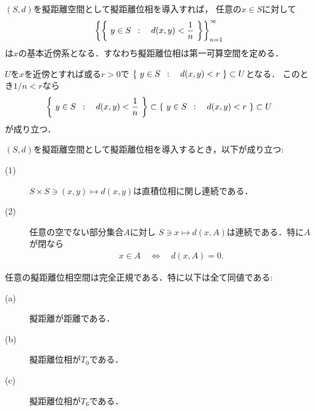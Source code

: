 	\begin{screen}
		\begin{thm}[擬距離位相は第一可算]
			$(S,d)$を擬距離空間として擬距離位相を導入すれば，
			任意の$x \in S$に対して
			\begin{align}
				\left\{\left\{\ y \in S\ \, : \quad d(x,y) < \frac{1}{n}\ \right\}\right\}_{n=1}^\infty
			\end{align}
			は$x$の基本近傍系となる．すなわち擬距離位相は第一可算空間を定める．
		\end{thm}
	\end{screen}
	
	\begin{prf}
		$U$を$x$を近傍とすれば或る$r > 0$で
		$\left\{\ y \in S\ \, : \quad d(x,y) < r\ \right\} \subset U$となる．
		このとき$1/n < r$なら
		\begin{align}
			\left\{\ y \in S\ \, : \quad d(x,y) < \frac{1}{n}\ \right\}
			\subset \left\{\ y \in S\ \, : \quad d(x,y) < r\ \right\} \subset U
		\end{align}
		が成り立つ．
		\QED
	\end{prf}
	
	\begin{screen}
		\begin{thm}[擬距離関数の連続性]\label{thm:continuity_of_pseudometrics}
			$(S,d)$を擬距離空間として擬距離位相を導入するとき，以下が成り立つ:
			\begin{description}
				\item[(1)] $S \times S \ni (x,y) \longmapsto d(x,y)$は直積位相に関し連続である．
				
				\item[(2)] 任意の空でない部分集合$A$に対し
					$S \ni x \longmapsto d(x,A)$は連続である．特に$A$が閉なら
					\begin{align}
						x \in A \quad \Longleftrightarrow \quad
						d(x,A) = 0. 
					\end{align} 
			\end{description}
		\end{thm}
	\end{screen}
	
	\begin{screen}
		\begin{thm}[擬距離空間は完全正規]
			任意の擬距離位相空間は完全正規である．特に以下は全て同値である:
			\begin{description}
				\item[(a)] 擬距離が距離である．
				\item[(b)] 擬距離位相が$T_0$である．
				\item[(c)] 擬距離位相が$T_6$である．
			\end{description}
		\end{thm}
	\end{screen}
	
